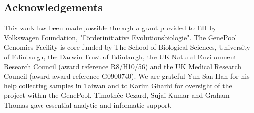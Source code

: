 \documentclass[10pt]{bmc_article}
\newenvironment{bmcformat}{\begin{raggedright}\baselineskip20pt\sloppy\setboolean{publ}{false}}{\end{raggedright}\baselineskip20pt\sloppy}
\begin{document}
\begin{bmcformat}
\section*{Acknowledgements}

This work has been made possible through a grant provided to EH by
Volkswagen Foundation, "F\"{o}rderinitiative Evolutionsbiologie". The
GenePool Genomics Facility is core funded by The School of Biological
Sciences, University of Edinburgh, the Darwin Trust of Edinburgh, the
UK Natural Environment Research Council (award reference R8/H10/56)
and the UK Medical Research Council (award award reference
G0900740). We are grateful Yun-San Han for his help collecting samples
in Taiwan and to Karim Gharbi for oversight of the project within the
GenePool. Timoth\'ee Cezard, Sujai Kumar and Graham Thomas gave
essential analytic and informatic support.


{
  
} %


\newpage


\end{bmcformat}
\end{document}
